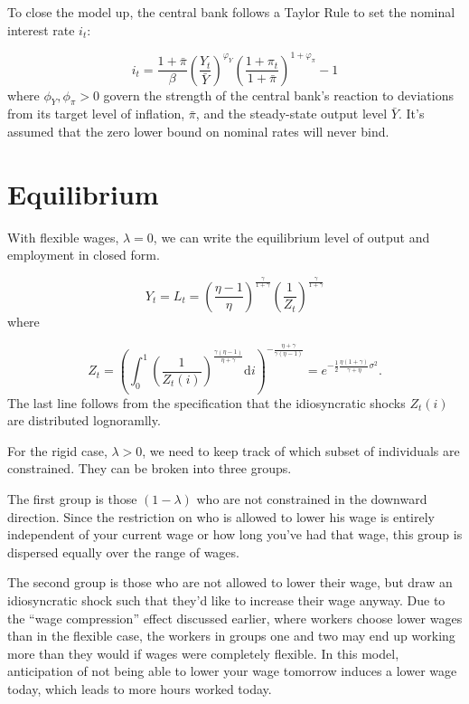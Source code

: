 \documentclass[12pt,a4paper]{scrartcl}            %
\begin{document}
To close the model up, the central bank follows a Taylor Rule to set the nominal interest rate $i_t$:

\begin{equation}
    \label{eq:taylor_rule}
    i_t = \frac{1 + \bar{\pi}}{\beta} \left( \frac{Y_t}{\bar{Y}} \right)^{\varphi_Y} \left( \frac{1 + \pi_t}{1 + \bar{\pi}} \right)^{1 + \varphi_{\pi}} - 1
\end{equation}
%
where $\phi_Y, \phi_{\pi} > 0$ govern the strength of the central bank's reaction to deviations from its target level of inflation, $\bar{\pi}$, and the steady-state output level $\bar{Y}$.
It's assumed that the zero lower bound on nominal rates will never bind.

\section{Equilibrium}
\label{sec:equilibrium}

With flexible wages, $\lambda = 0$, we can write the equilibrium level of output and employment in closed form.

\begin{equation}
    \label{eq:output_flexible}
    Y_t = L_t = \left( \frac{\eta - 1}{\eta} \right)^{\frac{\gamma}{1 + \gamma}} \left( \frac{1}{Z_t} \right)^{\frac{\gamma}{1 + \gamma}}
\end{equation}
%
where

\begin{equation}
    Z_t = \left( \int_{0}^{1}\! \left( \frac{1}{Z_t(i)} \right)^{\frac{\gamma(\eta - 1)}{\eta + \gamma}} \mathrm{d}i \right)^{-\frac{\eta + \gamma}{\gamma(\eta - 1)}} \!\!\! = e^{-\frac{1}{2} \frac{\eta(1 + \gamma)}{\gamma + \eta}\sigma^2 }.
\end{equation}
%
The last line follows from the specification that the idiosyncratic shocks $Z_t(i)$ are distributed lognoramlly.

For the rigid case, $\lambda > 0$, we need to keep track of which subset of individuals are constrained.
They can be broken into three groups.

The first group is those $(1 - \lambda)$ who are not constrained in the downward direction.
Since the restriction on who is allowed to lower his wage is entirely independent of your current wage or how long you've had that wage, this group is dispersed equally over the range of wages.

The second group is those who are not allowed to lower their wage, but draw an idiosyncratic shock such that they'd like to increase their wage anyway.
Due to the ``wage compression'' effect discussed earlier, where workers choose lower wages than in the flexible case, the workers in groups one and two may end up working more than they would if wages were completely flexible.
In this model, anticipation of not being able to lower your wage tomorrow induces a lower wage today, which leads to more hours worked today.
\end{document}
